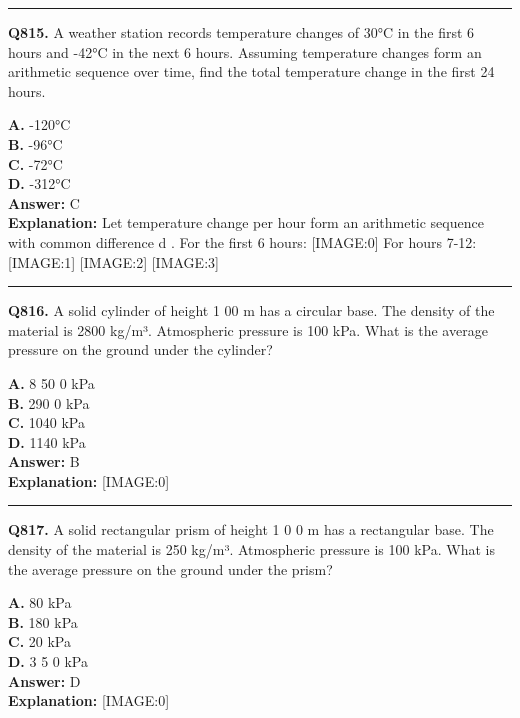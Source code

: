 \documentclass[12pt]{article}
\begin{document}
\hrule
\vspace{1em}


\noindent
\textbf{Q815.} A weather station records temperature changes of 30°C in the first 6 hours and -42°C in the next 6 hours. Assuming temperature changes form an arithmetic sequence over time, find the total temperature change in the first 24 hours.



\textbf{A.} -120°C \\
\textbf{B.} -96°C \\
\textbf{C.} -72°C \\
\textbf{D.} -312°C \\

\textbf{Answer:} C \\
\textbf{Explanation:} Let temperature change per hour form an arithmetic sequence with common difference
d
. For the first 6 hours:
[IMAGE:0]
For hours 7-12:
[IMAGE:1]
[IMAGE:2]
[IMAGE:3]

\hrule
\vspace{1em}


\noindent
\textbf{Q816.} A solid cylinder of height
1
00 m has a circular base. The density of the material is 2800 kg/m³. Atmospheric pressure is 100 kPa. What is the average pressure on the ground under the cylinder?



\textbf{A.} 8
50
0 kPa \\
\textbf{B.} 290
0 kPa \\
\textbf{C.} 1040 kPa \\
\textbf{D.} 1140 kPa \\

\textbf{Answer:} B \\
\textbf{Explanation:} [IMAGE:0]

\hrule
\vspace{1em}


\noindent
\textbf{Q817.} A solid rectangular prism of height 1
0
0 m has a rectangular base. The density of the material is 250 kg/m³. Atmospheric pressure is 100 kPa. What is the average pressure on the ground under the prism?



\textbf{A.} 80 kPa \\
\textbf{B.} 180 kPa \\
\textbf{C.} 20 kPa \\
\textbf{D.} 3
5
0 kPa \\

\textbf{Answer:} D \\
\textbf{Explanation:} [IMAGE:0]
\end{document}
